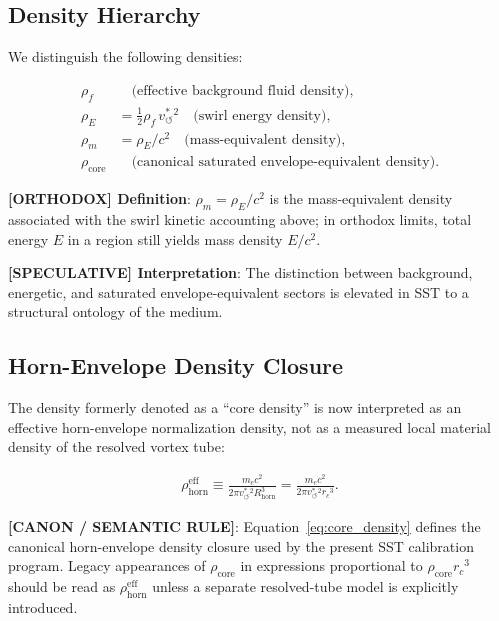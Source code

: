 \documentclass[11pt]{article}
\theoremstyle{definition}
\theoremstyle{plain}
\theoremstyle{remark}
\newcommand{\rhoF}{{\rho_{\!f}}}
\newcommand{\rhoE}{\rho_{\!E}}
\newcommand{\rhoM}{\rho_{\!m}}
\newcommand{\rhocore}{\rho_{\mathrm{core}}}
\newcommand{\rhohorn}{\rho_{\mathrm{horn}}^{\mathrm{eff}}}
\newcommand{\rc}{{r_c}}
\newcommand{\vchar}{v_{\!\boldsymbol{\circlearrowleft}}^{\ast}}
\begin{document}
    \subsection{Density Hierarchy}
        
        We distinguish the following densities:
        
        \begin{align}
            \rhoF &\quad \text{(effective background fluid density)}, \\
            \rhoE &= \tfrac12 \rhoF \, \vchar{}^2 \quad \text{(swirl energy density)}, \\
            \rhoM &= \rhoE / c^2 \quad \text{(mass-equivalent density)}, \\
            \rhocore &\quad \text{(canonical saturated envelope-equivalent density)}.
        \end{align}

        \textbf{[ORTHODOX] Definition}: $\rhoM=\rhoE/c^2$ is the mass-equivalent density associated with the swirl kinetic accounting above; in orthodox limits, total energy $E$ in a region still yields mass density $E/c^2$.

        \textbf{[SPECULATIVE] Interpretation}: The distinction between background, energetic, and saturated envelope-equivalent sectors is elevated in SST to a structural ontology of the medium.
    
    \subsection{Horn-Envelope Density Closure}
        
        The density formerly denoted as a ``core density'' is now interpreted as an
        effective horn-envelope normalization density, not as a measured local
        material density of the resolved vortex tube:
        
        \begin{align}
            \rhohorn
            \equiv
            \frac{m_e c^2}{2\pi \vchar{}^2 R_{\mathrm{horn}}^3}
            =
            \frac{m_e c^2}{2\pi \vchar{}^2 \rc^3}.
            \label{eq:core_density}
        \end{align}
        
        \textbf{[CANON / SEMANTIC RULE]}: Equation~\eqref{eq:core_density}
        defines the canonical horn-envelope density closure used by the present
        SST calibration program. Legacy appearances of $\rhocore$ in expressions
        proportional to $\rhocore\rc^3$ should be read as $\rhohorn$ unless a
        separate resolved-tube model is explicitly introduced.
\end{document}
